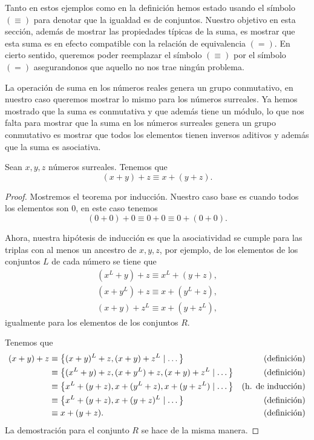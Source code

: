     Tanto en estos ejemplos como en la definici\'on hemos estado usando el s\'imbolo $(\equiv)$ para denotar que la igualdad es de conjuntos. Nuestro objetivo en esta secci\'on, adem\'as de mostrar las propiedades t\'ipicas de la suma, es mostrar que esta suma es en efecto compatible con la relaci\'on de equivalencia $(=)$. En cierto sentido, queremos poder reemplazar el s\'imbolo $(\equiv)$ por el s\'imbolo $(=)$ asegurandonos que aquello no nos trae ning\'un problema.

    La operaci\'on de suma en los n\'umeros reales genera un grupo conmutativo, en nuestro caso queremos mostrar lo mismo para los n\'umeros surreales. Ya hemos mostrado que la suma es conmutativa y que adem\'as tiene un m\'odulo, lo que nos falta para mostrar que la suma en los n\'umeros surreales genera un grupo conmutativo es mostrar que todos los elementos tienen inversos aditivos y adem\'as que la suma es asociativa.

    \begin{theorem}
        Sean $x, y, z$ n\'umeros surreales. Tenemos que
        \[
            (x+y)+z \equiv x+(y+z).
        \]
    \end{theorem}

    \begin{proof}
        Mostremos el teorema por inducci\'on. Nuestro caso base es cuando todos los elementos son $0$, en este caso tenemos
        \[
            (0+0)+0 \equiv 0+0 \equiv 0+(0+0).
        \]

        Ahora, nuestra hip\'otesis de inducci\'on es que la asociatividad se cumple para las triplas con al menos un ancestro de $x,y,z$, por ejemplo, de los elementos de los conjuntos $L$ de cada n\'umero se tiene que
        \begin{align*}
            (x^L+y)+z \equiv x^L + (y+z), \\
            (x+y^L)+z \equiv x + (y^L+z), \\
            (x+y)+z^L \equiv x + (y+z^L),
        \end{align*}
        igualmente para los elementos de los conjuntos $R$.

        Tenemos que
        \begin{align*}
            (x+y)+z & \equiv \left\{(x+y)^L+z, (x+y)+z^L\mid \dots\right\} & \text{(definici\'on)} \\
                    & \equiv \left\{(x^L+y)+z, (x+y^L)+z, (x+y)+z^L\mid \dots\right\} & \text{(definici\'on)}  \\
                    & \equiv \left\{x^L+(y+z), x+(y^L+z), x+(y+z^L)\mid \dots\right\} & \text{(h. de inducci\'on)}  \\
                    & \equiv \left\{x^L+(y+z), x+(y+z)^L\mid \dots\right\} & \text{(definici\'on)}  \\
                    & \equiv x+(y+z). & \text{(definici\'on)}
        \end{align*}
        La demostraci\'on para el conjunto $R$ se hace de la misma manera.
    \end{proof}

